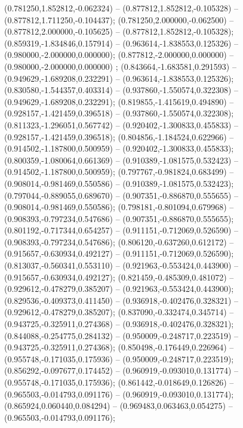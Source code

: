  (0.781250,1.852812,-0.062324) -- (0.877812,1.852812,-0.105328) -- (0.877812,1.711250,-0.104437);
 (0.781250,2.000000,-0.062500) -- (0.877812,2.000000,-0.105625) -- (0.877812,1.852812,-0.105328);
 (0.859319,-1.834846,0.157914) -- (0.963614,-1.838553,0.125326) -- (0.980000,-2.000000,0.000000);
 (0.877812,-2.000000,0.000000) -- (0.980000,-2.000000,0.000000) ;
 (0.843664,-1.683581,0.291593) -- (0.949629,-1.689208,0.232291) -- (0.963614,-1.838553,0.125326);
 (0.830580,-1.544357,0.403314) -- (0.937860,-1.550574,0.322308) -- (0.949629,-1.689208,0.232291);
 (0.819855,-1.415619,0.494890) -- (0.928157,-1.421459,0.396518) -- (0.937860,-1.550574,0.322308);
 (0.811323,-1.296051,0.567742) -- (0.920402,-1.300833,0.455833) -- (0.928157,-1.421459,0.396518);
 (0.804856,-1.184524,0.622966) -- (0.914502,-1.187800,0.500959) -- (0.920402,-1.300833,0.455833);
 (0.800359,-1.080064,0.661369) -- (0.910389,-1.081575,0.532423) -- (0.914502,-1.187800,0.500959);
 (0.797767,-0.981824,0.683499) -- (0.908014,-0.981469,0.550586) -- (0.910389,-1.081575,0.532423);
 (0.797044,-0.889055,0.689670) -- (0.907351,-0.886870,0.555655) -- (0.908014,-0.981469,0.550586);
 (0.798181,-0.801094,0.679968) -- (0.908393,-0.797234,0.547686) -- (0.907351,-0.886870,0.555655);
 (0.801192,-0.717344,0.654257) -- (0.911151,-0.712069,0.526590) -- (0.908393,-0.797234,0.547686);
 (0.806120,-0.637260,0.612172) -- (0.915657,-0.630934,0.492127) -- (0.911151,-0.712069,0.526590);
 (0.813037,-0.560341,0.553110) -- (0.921963,-0.553424,0.443900) -- (0.915657,-0.630934,0.492127);
 (0.821459,-0.485309,0.481072) -- (0.929612,-0.478279,0.385207) -- (0.921963,-0.553424,0.443900);
 (0.829536,-0.409373,0.411450) -- (0.936918,-0.402476,0.328321) -- (0.929612,-0.478279,0.385207);
 (0.837090,-0.332474,0.345714) -- (0.943725,-0.325911,0.274368) -- (0.936918,-0.402476,0.328321);
 (0.844088,-0.254775,0.284132) -- (0.950009,-0.248717,0.223519) -- (0.943725,-0.325911,0.274368);
 (0.850498,-0.176449,0.226964) -- (0.955748,-0.171035,0.175936) -- (0.950009,-0.248717,0.223519);
 (0.856292,-0.097677,0.174452) -- (0.960919,-0.093010,0.131774) -- (0.955748,-0.171035,0.175936);
 (0.861442,-0.018649,0.126826) -- (0.965503,-0.014793,0.091176) -- (0.960919,-0.093010,0.131774);
 (0.865924,0.060440,0.084294) -- (0.969483,0.063463,0.054275) -- (0.965503,-0.014793,0.091176);
